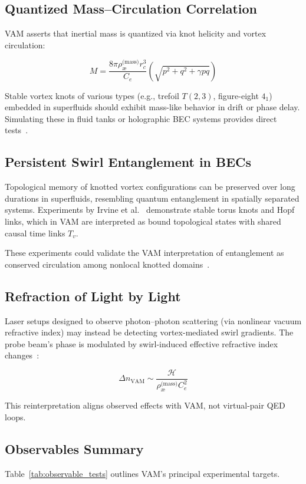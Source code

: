 \documentclass[preprint]{revtex4-2}
\begin{document}
    \subsection{Quantized Mass–Circulation Correlation}
    VAM asserts that inertial mass is quantized via knot helicity and vortex circulation:

    \[
        M = \frac{8\pi \rho_{\text{\ae}}^\text{(mass)} r_c^3}{C_e} \left( \sqrt{p^2 + q^2 + \gamma pq} \right)
    \]

    Stable vortex knots of various types (e.g., trefoil \( T(2,3) \), figure-eight \( 4_1 \)) embedded in superfluids should exhibit mass-like behavior in drift or phase delay. Simulating these in fluid tanks or holographic BEC systems provides direct tests~\cite{kleckner2013creation, volovik2003universe}.

    \subsection{Persistent Swirl Entanglement in BECs}
    Topological memory of knotted vortex configurations can be preserved over long durations in superfluids, resembling quantum entanglement in spatially separated systems. Experiments by Irvine et al.~\cite{kleckner2013creation} demonstrate stable torus knots and Hopf links, which in VAM are interpreted as bound topological states with shared causal time links $T_v$.

    These experiments could validate the VAM interpretation of entanglement as conserved circulation among nonlocal knotted domains~\cite{volovik2003universe, kiehn2005torsion}.

    \subsection{Refraction of Light by Light}
    Laser setups designed to observe photon–photon scattering (via nonlinear vacuum refractive index) may instead be detecting vortex-mediated swirl gradients. The probe beam’s phase is modulated by swirl-induced effective refractive index changes~\cite{sarazin2016refraction}:

    \[
        \Delta n_{\text{VAM}} \sim \frac{\mathcal{H}}{\rho_{\text{\ae}}^{\text{(mass)}} C_e^2}
    \]

    This reinterpretation aligns observed effects with VAM, not virtual-pair QED loops.

    \subsection{Observables Summary}
    Table~\ref{tab:observable_tests} outlines VAM’s principal experimental targets.
\end{document}
